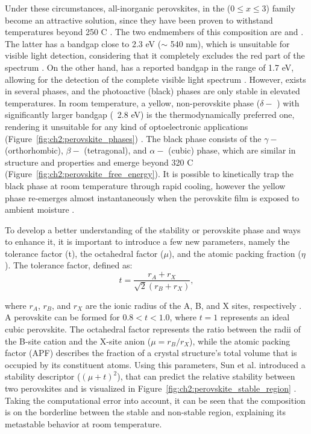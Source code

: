 Under these circumstances, all-inorganic perovskites, in the  ($0 \le x \le 3$) family become an attractive solution, since they have been proven to withstand temperatures beyond 250 \degree C \cite{Dong2021High-TemperatureCells}. The two endmembers of this composition are  and . The latter has a bandgap close to 2.3 eV ($\sim$ 540 nm), which is unsuitable for visible light detection, considering that it completely excludes the red part of the spectrum \cite{Tong2020RecentCells}. On the other hand,  has a reported bandgap in the range of 1.7 eV, allowing for the detection of the complete visible light spectrum \cite{Zhao2018ThermodynamicallyPhotovoltaics}. However,  exists in several phases, and the photoactive (black) phases are only stable in elevated temperatures. In room temperature, a yellow, non-perovskite phase ($\delta-$ ) with significantly larger bandgap (~2.8 eV) is the thermodynamically preferred one, rendering it unsuitable for any kind of optoelectronic applications (Figure~\ref{fig:ch2:perovskite_phases}) \cite{Cho2021Long-termNetwork, Burwig2018CrystalFilms, Steele2022AnFilms}. The black phase consists of the $\gamma-$ (orthorhombic), $\beta-$ (tetragonal), and $\alpha-$ (cubic) phase, which are similar in structure and properties and emerge beyond 320 \degree C (Figure~\ref{fig:ch2:perovskite_free_energy}). It is possible to kinetically trap the black phase at room temperature through rapid cooling, however the yellow phase re-emerges almost instantaneously when the perovskite film is exposed to ambient moisture \cite{Steele2019ThermalFilms}. 

To develop a better understanding of the stability or perovskite phase and ways to enhance it, it is important to introduce a few new parameters, namely the tolerance factor (t), the octahedral factor ($\mu$), and the atomic packing fraction ($\eta$). The tolerance factor, defined as:
\begin{equation}
    t = \frac{r_A + r_X}{\sqrt{2}(r_B + r_X)},
    \label{eq:tolerance_factor}
\end{equation} 

where $r_A$, $r_B$, and $r_X$ are the ionic radius of the A, B, and X sites, respectively \cite{Goldschmidt1926DieKrystallochemie}. A perovskite can be formed for $0.8 < t < 1.0$, where $t = 1$ represents an ideal cubic perovskite. The octahedral factor represents the ratio between the radii of the B-site cation and the X-site anion ($\mu = r_B/r_X$), while the atomic packing factor (APF) describes the fraction of a crystal structure's total volume that is occupied by its constituent atoms. Using this parameters, Sun et al. introduced a stability descriptor ($(\mu + t)^2$), that can predict the relative stability between two perovskites and is visualized in Figure~\ref{fig:ch2:perovskite_stable_region} \cite{Sun2017ThermodynamicPerovskites}. Taking the computational error into account, it can be seen that the  composition is on the borderline between the stable and non-stable region, explaining its metastable behavior at room temperature.  

